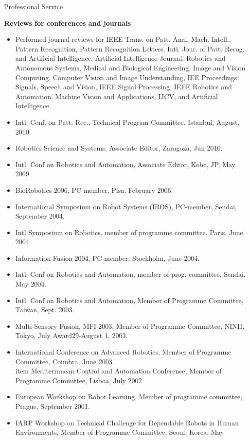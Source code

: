 \documentclass{article}
\begin{document}
\begin{cv}
\begin{cvlist}{Professional Service}
\item {\bf Reviews for conferences and journals}
  \begin{itemize}
  \item Performed journal reviews for IEEE Trans.  on Patt.  Anal.
    Mach.  Intell., Pattern Recognition, Pattern Recognition Letters,
    Intl.  Jour.  of Patt.  Recog.  and Artificial Intelligence,
    Artificial Intelligence Journal, Robotics and Autonomous Systems,
    Medical and Biological Engineering, Image and Vision Computing,
    Computer Vision and Image Understanding, IEE Proceedings: Signals,
    Speech and Vision, IEEE Signal Processing, IEEE Robotics and
    Automation, Machine Vision and Applications, IJCV, and Artificial
    Intelligence.
  \item Intl. Conf. on Patt. Rec., Technical Program Committee,
    Istanbul, August, 2010.
  \item Robotics Science and Systems, Associate Editor, Zaragoza, Jun
    2010.
  \item Intl. Conf on Robotics and Automation, Associate Editor, Kobe,
    JP, May 2009
  \item BioRobotics 2006, PC member, Pisa, February 2006.
  \item International Symposium on Robot Systems (IROS), PC-member, Sendai,
    September 2004.
  \item Intl Symposium on Robotics, member of programme committee,
    Paris, June 2004.
  \item Information Fusion 2004, PC-member, Stockholm, June 2004.
  \item Intl. Conf on Robotics and Automation, member of
    prog. committee, Sendai, May 2004.
  \item Intl. Conf on Robotics and Automation, Member of Programme
    Committee, Taiwan, Sept. 2003.
  \item Multi-Sensory Fusion, MFI-2003, Member of Programme Committee,
    NINII, Tokyo, July Award29-August 1, 2003.
  \item International Conference on Advanced Robotics, Member of
    Programme Committee, Coimbra, June 2003.
    \\item Mediterranean Control and Automation Conference, Member of
    Programme Committee, Lisboa, July 2002
  \item European Workshop on Robot Learning, Member of programme
    committee, Prague, September 2001.
  \item IARP Workshop on Technical Challenge for Dependable Robots in
    Human Environments, Member of Programme Committee, Seoul, Korea, May

\end{itemize}
\end{cvlist}
\end{cv}
\end{document}

